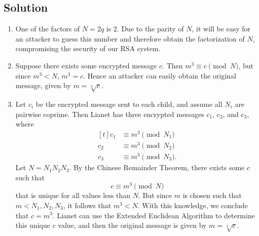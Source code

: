 \documentclass{article}
\newcounter{counter}
\newcommand{\Exercise}{Exercise \stepcounter{counter}\thecounter}
\begin{document}
\subsection*{Solution}
    \begin{enumerate}
        \item One of the factors of $N = 2q$ is $2$. Due to the parity of $N$, it will be easy for an attacker to guess this number and therefore obtain the factorization of $N$, compromising the security of our RSA system.
        \item Suppose there exists some encrypted message $c$. Then $m^{3} \equiv c \pmod{N}$, but since $m^{3} < N$, $m^{3} = c$. Hence an attacker can easily obtain the original message, given by $m = \sqrt[3]{c}$.
        \item Let $c_{i}$ be the encrypted message sent to each child, and assume all $N_{i}$ are pairwise coprime. Then Lianet has three encrypted messages $c_{1}$, $c_{2}$, and $c_{3}$, where
        $$\begin{aligned}[t]
            c_{1} &\equiv m^{3} \pmod{N_{1}} \\
            c_{2} &\equiv m^{3} \pmod{N_{2}} \\
            c_{3} &\equiv m^{3} \pmod{N_{3}}.
        \end{aligned}$$
        Let $N = N_{1}N_{2}N_{3}$. By the Chinese Remainder Theorem, there exists some $c$ such that $$c \equiv m^{3} \pmod{N}$$ that is unique for all values less than $N$. But since $m$ is chosen such that $m < N_{1}, N_{2}, N_{3}$, it follows that $m^{3} < N$. With this knowledge, we conclude that $c = m^{3}$. Lianet can use the Extended Euclidean Algorithm to determine this unique $c$ value, and then the original message is given  by $m = \sqrt[3]{c}$.
    \end{enumerate}


\end{document}
